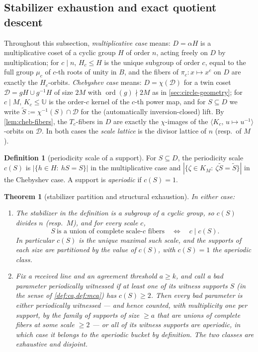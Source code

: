 \documentclass[11pt]{article}
\newtheorem{theorem}{Theorem}[section]
\theoremstyle{definition}
\newtheorem{definition}[definition]{Definition}
\theoremstyle{remark}
\newcommand{\B}{B}
\newcommand{\UU}{\mathbb{U}}
\begin{document}
\subsection{Stabilizer exhaustion and exact quotient descent}\label{sec:discharge-T1}

Throughout this subsection, \emph{multiplicative case} means: $D=\alpha H$ is a multiplicative coset of a cyclic group $H$ of order $n$, acting freely on $D$ by multiplication; for $c\mid n$, $H_c\le H$ is the unique subgroup of order $c$, equal to the full group $\mu_c$ of $c$-th roots of unity in $\B$, and the fibers of $\pi_c:x\mapsto x^c$ on $D$ are exactly the $H_c$-orbits. \emph{Chebyshev case} means: $D=\chi(\mathcal D)$ for a twin coset $\mathcal D=gH\cup g^{-1}H$ of size $2M$ with $\operatorname{ord}(g)\nmid2M$ as in \cref{sec:circle-geometry}; for $c\mid M$, $K_c\le\UU$ is the order-$c$ kernel of the $c$-th power map, and for $S\subseteq D$ we write $\widetilde S:=\chi^{-1}(S)\cap\mathcal D$ for the (automatically inversion-closed) lift. By \cref{lem:cheb-fibers}, the $T_c$-fibers in $D$ are exactly the $\chi$-images of the $\langle K_c,\,u\mapsto u^{-1}\rangle$-orbits on $\mathcal D$. In both cases the \emph{scale lattice} is the divisor lattice of $n$ (resp.\ of $M$).

\begin{definition}[periodicity scale of a support]\label{def:periodicity-scale}
For $S\subseteq D$, the periodicity scale $c(S)$ is $|\{h\in H:\ hS=S\}|$ in the multiplicative case and $|\{\zeta\in K_M:\ \zeta\widetilde S=\widetilde S\}|$ in the Chebyshev case. A support is \emph{aperiodic} if $c(S)=1$.
\end{definition}

\begin{theorem}[stabilizer partition and structural exhaustion]\label{thm:stabilizer-partition}
In either case:
\begin{enumerate}[label=\textup{(\roman*)}]
\item The stabilizer in the definition is a subgroup of a cyclic group, so $c(S)$ divides $n$ \textup(resp.\ $M$\textup), and for every scale $c$,
\[
S\ \text{is a union of complete scale-$c$ fibers}
\quad\Longleftrightarrow\quad
c\mid c(S).
\]
In particular $c(S)$ is the unique maximal such scale, and the supports of each size are partitioned by the value of $c(S)$, with $c(S)=1$ the aperiodic class.
\item Fix a received line and an agreement threshold $a\ge k$, and call a bad parameter \emph{periodically witnessed} if at least one of its witness supports $S$ \textup(in the sense of \cref{def:ca,def:mca}\textup) has $c(S)\ge2$. Then every bad parameter is either periodically witnessed --- and hence counted, with multiplicity one per support, by the family of supports of size $\ge a$ that are unions of complete fibers at some scale $\ge2$ --- or all of its witness supports are aperiodic, in which case it belongs to the aperiodic bucket by definition. The two classes are exhaustive and disjoint.
\end{enumerate}
\end{theorem}
\end{document}
